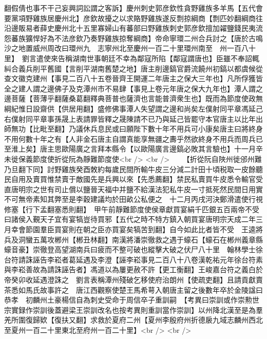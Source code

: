 翻假倩也事不干己妄興詞訟謂之客訴】慶州刺史郭彦欽性貪野雞族多羊馬【五代會要黨項野雞族居慶州北】彦欽故擾之以求賂野雞族遂反剽掠綱商【剽匹妙翻綱商往沿邊販易者薛史慶州北十五里寡婦山有蕃部曰野雞族刺史郭彦欽擅加糴鹽錢民夷流怨蕃族獷悍好為不法彦欽乃奏野雞族掠奪綱商】帝命寧環二州合兵討之【唐於古鳴沙之地置威州周改曰環州九　志寧州北至慶州一百二十里環州南至　州一百八十里】　劉言遣使來告稱湖南世事朝廷不幸為鄰寇所陷【鄰寇謂唐也】臣雖不奉詔輒糾合義兵削平舊國【言削平湖南舊楚之地】唐主削邊鎬官爵流饒州初鎬以都虞候從查文徽克建州【事見二百八十五卷晉齊王開運二年唐主之保大三年也】凡所俘獲皆全之建人謂之邊佛子及克潭州市不易肆【事見上卷元年唐之保大九年也】潭人謂之邊菩薩【菩薄乎翻薩桑葛翻釋典菩普也薩濟也言能普濟衆生也】既而為節度使政無綱紀惟日設齋供【供居用翻】盛修佛事潭人失望謂之邊和尚矣左僕射同平章馮延己右僕射同平章事孫晟上表請罪皆釋之晟陳請不已乃與延己皆罷守本官唐主以比年出師無功【比毗至翻】乃議休兵息民或曰願陛下數十年不用兵可小康矣唐主曰將終身不用何數十年之有【人非金石唐主自謂真能享無疆之夀乎然欲終身不用兵而周兵已至淮上矣】唐主思歐陽廣之言拜本縣令【以歐陽廣言邊鎬必敗其言驗也】十一月辛未徙保義節度使折從阮為靜難節度使<br />
<br />
　　【折從阮自陜州徙邠州難乃旦翻下同】討野雞族癸酉敇約每歲民間所輸牛皮三分減二計田十頃税取一皮餘聽民自用及賣買惟禁賣于敵國先是兵興以來【先悉薦翻】禁民私賣買牛皮悉令輸官受直唐明宗之世有司止償以鹽晉天福中并鹽不給漢法犯私牛皮一寸抵死然民間日用實不可無帝素知其弊至是李穀建議均於田畝公私便之　十二月丙戌河決鄭滑遣使行視修塞【行下孟翻塞悉則翻】　甲午前靜難節度使侯章獻買宴絹千匹銀五百兩帝不受曰諸侯入覲天子宜有宴犒豈待買邪【五代之時不特方鎮入朝買宴唐明宗天成二年三月幸會節園羣臣買宴則在朝之臣亦買宴矣犒苦到翻】自今如此比者皆不受　王逵將兵及洞蠻五萬攻郴州【郴丑林翻】南漢將潘崇徹救之遇于蠔石【蠔石在郴州義章縣蠔音豪】崇徹登高望湖南兵曰疲而不整可破也縱擊大破之伏尸八十里　翰林學士徐台符請誅誣告李崧者葛延遇及李澄【誣李崧事見二百八十八卷漢乾祐元年徐台符素與李崧善故為請誅誣告者】馮道以為屢更赦不許【更工衡翻】王峻嘉台符之義白於帝癸卯收延遇澄誅之　劉言表稱潭州殘破乞移使府治朗州【使疏吏翻】且請貢獻賣茶悉如馬氏故事許之　唐江西觀察使楚王馬希萼入朝唐主留之後數年卒於金陵諡曰恭孝　初麟州土豪楊信自為刺史受命于周信卒子重訓嗣　【考異曰崇訓或作崇勲世宗實録作崇訓後蓋避梁王崇訓改名也按考異則重訓當作崇訓】以州降北漢至是為羣羌所圍復歸欵【復扶又翻】求救於夏府二州【夏州李殷府州折德扆九域志麟州西北至夏州一百二十里東北至府州一百二十里】<br />
<br />
